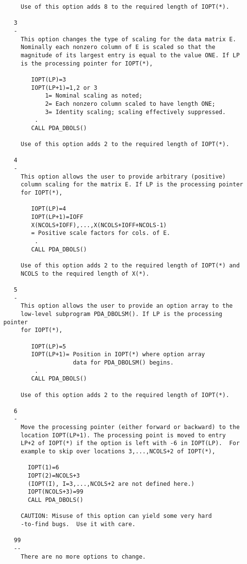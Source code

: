 \begin{verbatim}
     Use of this option adds 8 to the required length of IOPT(*).

   3
   -
     This option changes the type of scaling for the data matrix E.
     Nominally each nonzero column of E is scaled so that the
     magnitude of its largest entry is equal to the value ONE. If LP
     is the processing pointer for IOPT(*),

        IOPT(LP)=3
        IOPT(LP+1)=1,2 or 3
            1= Nominal scaling as noted;
            2= Each nonzero column scaled to have length ONE;
            3= Identity scaling; scaling effectively suppressed.
         .
        CALL PDA_DBOLS()

     Use of this option adds 2 to the required length of IOPT(*).

   4
   -
     This option allows the user to provide arbitrary (positive)
     column scaling for the matrix E. If LP is the processing pointer
     for IOPT(*),

        IOPT(LP)=4
        IOPT(LP+1)=IOFF
        X(NCOLS+IOFF),...,X(NCOLS+IOFF+NCOLS-1)
        = Positive scale factors for cols. of E.
         .
        CALL PDA_DBOLS()

     Use of this option adds 2 to the required length of IOPT(*) and
     NCOLS to the required length of X(*).

   5
   -
     This option allows the user to provide an option array to the
     low-level subprogram PDA_DBOLSM(). If LP is the processing pointer
     for IOPT(*),

        IOPT(LP)=5
        IOPT(LP+1)= Position in IOPT(*) where option array
                    data for PDA_DBOLSM() begins.
         .
        CALL PDA_DBOLS()

     Use of this option adds 2 to the required length of IOPT(*).

   6
   -
     Move the processing pointer (either forward or backward) to the
     location IOPT(LP+1). The processing point is moved to entry
     LP+2 of IOPT(*) if the option is left with -6 in IOPT(LP).  For
     example to skip over locations 3,...,NCOLS+2 of IOPT(*),

       IOPT(1)=6
       IOPT(2)=NCOLS+3
       (IOPT(I), I=3,...,NCOLS+2 are not defined here.)
       IOPT(NCOLS+3)=99
       CALL PDA_DBOLS()

     CAUTION: Misuse of this option can yield some very hard
     -to-find bugs.  Use it with care.

   99
   --
     There are no more options to change.


\end{verbatim}
